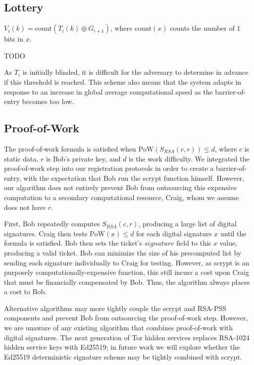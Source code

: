 \documentclass[USenglish,oneside,twocolumn]{article}
\begin{document}
\subsection{Lottery} %

$ V_{i}(k) = \mathrm{count}(T_{i}(k) \oplus G_{i + 1}) $, where $ \mathrm{count}(x) $ counts the number of $ 1 $ bits in $ x $.


TODO

 As $ T_{i} $ is initially blinded, it is difficult for the adversary to determine in advance if this threshold is reached. This scheme also means that the system adapts in response to an increase in global average computational speed as the barrier-of-entry becomes too low.

\subsection{Proof-of-Work} %

The proof-of-work formula is satisfied when $ \mathrm{PoW}(S_{\mathit{RSA}}(c, r)) \leq d $, where $ c $ is static data, $ r $ is Bob's private key, and $ d $ is the work difficulty. We integrated the proof-of-work step into our registration protocols in order to create a barrier-of-entry, with the expectation that Bob run the scrypt function himself. However, our algorithm does not entirely prevent Bob from outsourcing this expensive computation to a secondary computational resource, Craig, whom we assume does not have $ r $. 

First, Bob repeatedly computes $ S_{\mathit{RSA}}(c, r) $, producing a large list of digital signatures. Craig then tests $ \mathrm{PoW}(x) \leq d $ for each digital signature $ x $ until the formula is satisfied. Bob then sets the ticket's $ \mathit{signature} $ field to this $ x $ value, producing a valid ticket. Bob can minimize the size of his precomputed list by sending each signature individually to Craig for testing. However, as scrypt is an purposely computationally-expensive function, this still incurs a cost upon Craig that must be financially compensated by Bob. Thus, the algorithm always places a cost to Bob.

Alternative algorithms may more tightly couple the scrypt and RSA-PSS components and prevent Bob from outsourcing the proof-of-work step. However, we are unaware of any existing algorithm that combines proof-of-work with digital signatures. The next generation of Tor hidden services \cite{TorProp224} replaces RSA-1024 hidden service keys with Ed25519; in future work we will explore whether the Ed25519 deterministic signature scheme may be tightly combined with scrypt. 
\end{document}
